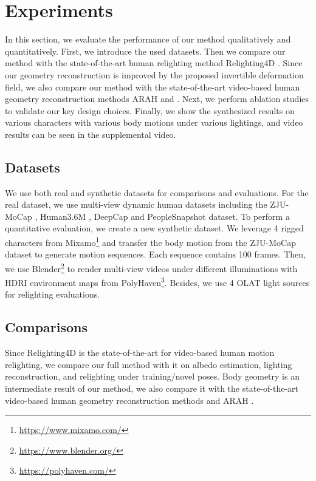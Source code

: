 \section{Experiments}


In this section, we evaluate the performance of our method qualitatively and quantitatively.
First, we introduce the used datasets.  
Then we compare our method with the state-of-the-art human relighting method Relighting4D \cite{Relighting4D}.
Since our geometry reconstruction is improved by the proposed invertible deformation field, we also compare our method with the state-of-the-art video-based human geometry reconstruction methods ARAH \cite{ARAH} and \citet{peng2022animatable}.
Next, we perform ablation studies to validate our key design choices.
Finally, we show the synthesized results on various characters with various body motions under various lightings, and video results can be seen in the supplemental video.

\subsection{Datasets}

We use both real and synthetic datasets for comparisons and evaluations.
For the real dataset, we use multi-view dynamic human datasets including the ZJU-MoCap \cite{neuralbody}, Human3.6M \cite{h36m}, DeepCap \cite{deepcap} and PeopleSnapshot \cite{alldieck2018video} dataset.
To perform a quantitative evaluation, we create a new synthetic dataset.
We leverage 4 rigged characters from Mixamo\footnote{\url{https://www.mixamo.com/}} and transfer the body motion from the ZJU-MoCap dataset to generate motion sequences. Each sequence contains 100 frames.
Then, we use Blender\footnote{\url{https://www.blender.org/}} to render multi-view videos under different illuminations with HDRI environment maps from PolyHaven\footnote{\url{https://polyhaven.com/}}.
Besides, we use 4 OLAT light sources for relighting evaluations.

\subsection{Comparisons}
Since Relighting4D \cite{Relighting4D} is the state-of-the-art for video-based human motion relighting, we compare our full method with it on albedo estimation, lighting reconstruction, and relighting under training/novel poses.
Body geometry is an intermediate result of our method, we also compare it with the state-of-the-art video-based human geometry reconstruction methods \citet{peng2022animatable} and ARAH \cite{ARAH}.

